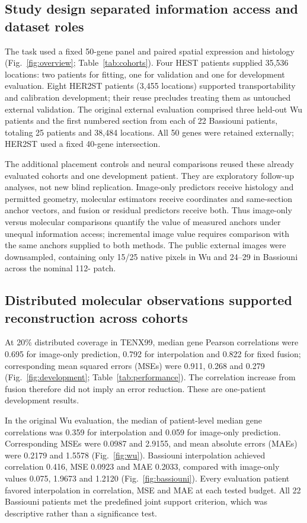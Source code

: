 \subsection{Study design separated information access and dataset roles}
The task used a fixed 50-gene panel and paired spatial expression and histology (Fig.~\ref{fig:overview}; Table~\ref{tab:cohorts}). Four HEST patients supplied 35,536 locations: two patients for fitting, one for validation and one for development evaluation. Eight HER2ST patients (3,455 locations) supported transportability and calibration development; their reuse precludes treating them as untouched external validation. The original external evaluation comprised three held-out Wu patients and the first numbered section from each of 22 Bassiouni patients, totaling 25 patients and 38,484 locations. All 50 genes were retained externally; HER2ST used a fixed 40-gene intersection.

The additional placement controls and neural comparisons reused these already evaluated cohorts and one development patient. They are exploratory follow-up analyses, not new blind replication. Image-only predictors receive histology and permitted geometry, molecular estimators receive coordinates and same-section anchor vectors, and fusion or residual predictors receive both. Thus image-only versus molecular comparisons quantify the value of measured anchors under unequal information access; incremental image value requires comparison with the same anchors supplied to both methods. The public external images were downsampled, containing only 15/25 native pixels in Wu and 24--29 in Bassiouni across the nominal 112-\um{} patch.



\FloatBarrier

\subsection{Distributed molecular observations supported reconstruction across cohorts}
At 20\% distributed coverage in TENX99, median gene Pearson correlations were 0.695 for image-only prediction, 0.792 for interpolation and 0.822 for fixed fusion; corresponding mean squared errors (MSEs) were 0.911, 0.268 and 0.279 (Fig.~\ref{fig:development}; Table~\ref{tab:performance}). The correlation increase from fusion therefore did not imply an error reduction. These are one-patient development results.


In the original Wu evaluation, the median of patient-level median gene correlations was 0.359 for interpolation and 0.059 for image-only prediction. Corresponding MSEs were 0.0987 and 2.9155, and mean absolute errors (MAEs) were 0.2179 and 1.5578 (Fig.~\ref{fig:wu}). Bassiouni interpolation achieved correlation 0.416, MSE 0.0923 and MAE 0.2033, compared with image-only values 0.075, 1.9673 and 1.2120 (Fig.~\ref{fig:bassiouni}). Every evaluation patient favored interpolation in correlation, MSE and MAE at each tested budget. All 22 Bassiouni patients met the predefined joint support criterion, which was descriptive rather than a significance test.




